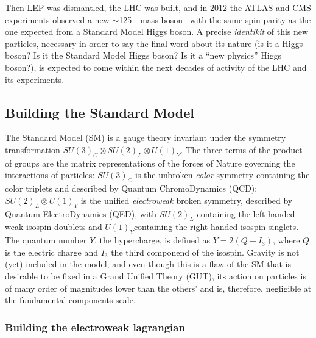 Then LEP was dismantled, the LHC was built, and in 2012 
the ATLAS and CMS experiments
observed a new $\sim$125~\gev\ mass boson~\cite{2012gk,Chatrchyan201230}
with the same spin-parity as the one expected from a Standard Model
Higgs boson. A precise {\it identikit} of this new particles, necessary
in order to say the final word about its nature (is it a Higgs boson?
Is it the Standard Model Higgs boson? Is it a ``new physics'' Higgs boson?),
is expected to come within the next decades of activity of the LHC and its
experiments.


\subsection{Building the Standard Model}\label{sec:THsm}

The Standard Model (SM) is a gauge theory invariant under the symmetry 
transformation $SU(3)_{C} \otimes SU(2)_{L} \otimes U(1)_{Y}$. The
three terms of the product of groups are the matrix representations
of the forces of Nature
governing the interactions of particles: $SU(3)_{C}$ is the unbroken {\it color}
symmetry containing the color triplets and described by Quantum ChromoDynamics 
(QCD); $SU(2)_{L} \otimes U(1)_{Y}$ is the unified {\it electroweak} broken 
symmetry, described by Quantum ElectroDynamics (QED), with 
$SU(2)_{L}$ containing the left-handed weak isospin doublets and 
$U(1)_{Y}$containing the right-handed isospin singlets.
The quantum number $Y$, the hypercharge, is defined as $Y=2(Q-I_3)$, 
where $Q$ is the electric
charge and $I_3$ the third componend of the isospin.
Gravity is not (yet) included in the model, and even though
this is a flaw of the SM that is desirable to be fixed in a 
Grand Unified Theory (GUT), its action on particles is of many order
of magnitudes lower than the others' and is, therefore, negligible at the
fundamental components scale.


\subsubsection{Building the electroweak lagrangian}\label{sec:ewlagr}

